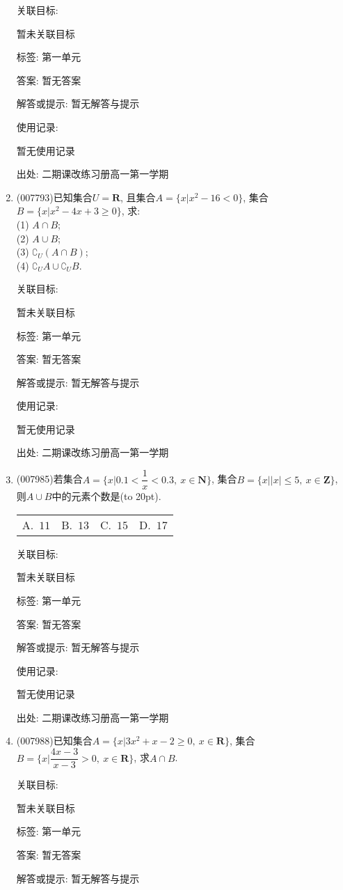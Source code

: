 \documentclass[10pt,a4paper]{article}
\newcommand{\bracket}[1]{(\hbox to #1pt{})}
\newcommand{\fourch}[4]{\par\begin{tabular}{p{.23\textwidth}p{.23\textwidth}p{.23\textwidth}p{.23\textwidth}}
A.~#1 &B.~#2& C.~#3& D.~#4
\end{tabular}}
\begin{document}
\begin{enumerate}[1.]
关联目标:

暂未关联目标



标签: 第一单元

答案: 暂无答案

解答或提示: 暂无解答与提示

使用记录:

暂无使用记录


出处: 二期课改练习册高一第一学期
\item { (007793)}已知集合$U=\mathbf{R}$, 且集合$A=\{x|x^2-16<0\}$, 集合$B=\{x|x^2-4x+3\ge 0\}$, 求:\\
(1) $A\cap B$;\\
(2) $A\cup B$;\\
(3) $\complement _U(A\cap B)$;\\
(4) $\complement _UA\cup \complement _UB$.


关联目标:

暂未关联目标



标签: 第一单元

答案: 暂无答案

解答或提示: 暂无解答与提示

使用记录:

暂无使用记录


出处: 二期课改练习册高一第一学期
\item { (007985)}若集合$A=\{x|0.1<\dfrac 1x<0.3,\ x\in \mathbf{N}\}$, 集合$B=\{x||x|\le 5,\ x\in \mathbf{Z}\}$, 则$A\cup B$中的元素个数是\bracket{20}.
\fourch{$11$}{$13$}{$15$}{$17$}


关联目标:

暂未关联目标



标签: 第一单元

答案: 暂无答案

解答或提示: 暂无解答与提示

使用记录:

暂无使用记录


出处: 二期课改练习册高一第一学期
\item { (007988)}已知集合$A=\{x|3x^2+x-2\ge 0,\  x\in \mathbf{R}\}$, 集合$B=\{x|\dfrac{4x-3}{x-3}>0,\ x\in \mathbf{R}\}$, 求$A\cap B$.


关联目标:

暂未关联目标



标签: 第一单元

答案: 暂无答案

解答或提示: 暂无解答与提示


\end{enumerate}
\end{document}
